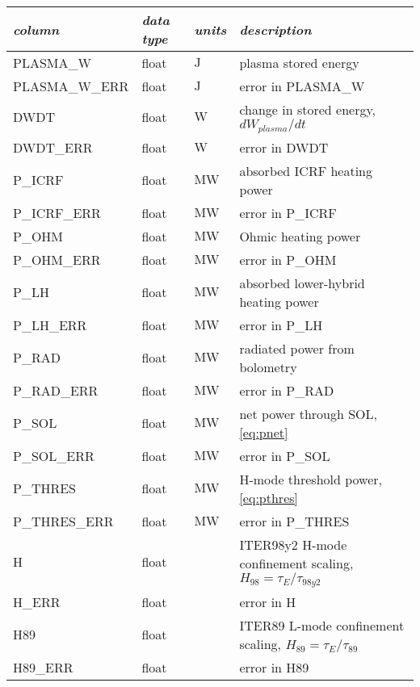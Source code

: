 \begin{table*}[h]
 \pushtooutside
 {\begin{tabu} to 143mm {X[2.348,l]X[1,c]X[1,c]X[4.348,c]}
   \toprule
   \emph{column} &
   \emph{data type} &
   \emph{units} &
   \emph{description}
   \\
   \midrule
   PLASMA\_W &
   float &
   $\si{\joule}$ &
   plasma stored energy
   \\
   PLASMA\_W\_ERR &
   float &
   $\si{\joule}$ &
   error in PLASMA\_W
   \\
   DWDT &
   float &
   $\si{\watt}$ &
   change in stored energy, $dW_{plasma}/dt$
   \\
   DWDT\_ERR &
   float &
   $\si{\watt}$ &
   error in DWDT
   \\
   P\_ICRF &
   float &
   $\si{\mega\watt}$ &
   absorbed ICRF heating power
   \\
   P\_ICRF\_ERR &
   float &
   $\si{\mega\watt}$ &
   error in P\_ICRF
   \\
   P\_OHM &
   float &
   $\si{\mega\watt}$ &
   Ohmic heating power
   \\
   P\_OHM\_ERR &
   float &
   $\si{\mega\watt}$ &
   error in P\_OHM
   \\
   P\_LH &
   float &
   $\si{\mega\watt}$ &
   absorbed lower-hybrid heating power
   \\
   P\_LH\_ERR &
   float &
   $\si{\mega\watt}$ &
   error in P\_LH
   \\
   P\_RAD &
   float &
   $\si{\mega\watt}$ &
   radiated power from bolometry
   \\
   P\_RAD\_ERR &
   float &
   $\si{\mega\watt}$ &
   error in P\_RAD
   \\
   P\_SOL &
   float &
   $\si{\mega\watt}$ &
   net power through SOL, \cref{eq:pnet}
   \\
   P\_SOL\_ERR &
   float &
   $\si{\mega\watt}$ &
   error in P\_SOL
   \\
   P\_THRES &
   float &
   $\si{\mega\watt}$ &
   H-mode threshold power, \cref{eq:pthres}
   \\
   P\_THRES\_ERR &
   float &
   $\si{\mega\watt}$ &
   error in P\_THRES
   \\
   H &
   float &
   &
   ITER98y2 H-mode confinement scaling, $H_{98} = \tau_E / \tau_{98y2}$
   \\
   H\_ERR &
   float &
   &
   error in H
   \\
   H89 &
   float &
   &
   ITER89 L-mode confinement scaling, $H_{89} = \tau_E / \tau_{89}$
   \\
   H89\_ERR &
   float &
   &
   error in H89
   \\
   \bottomrule
  \end{tabu}}
\end{table*}

